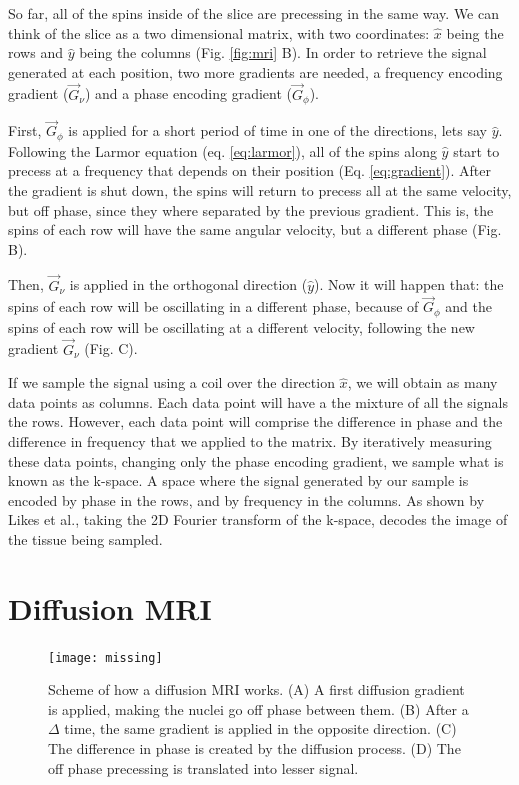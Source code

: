 So far, all of the spins inside of the slice are precessing in the same way.
We can think of the slice as a two dimensional matrix, with two coordinates:
$\hat x$ being the rows and $\hat y$ being the columns (Fig. \ref{fig:mri} B).
In order to retrieve the signal generated at each position, two more gradients
are needed, a frequency encoding gradient ($\vec G_{\nu}$) and a phase encoding
gradient ($\vec G_{\phi}$). 

First, $\vec G_{\phi}$ is applied for a short period of time in one of
the directions, lets say $\hat y$. Following the Larmor equation (eq. \ref{eq:larmor}),
all of the spins along $\hat y$ start to precess at a frequency that depends
on their position (Eq. \ref{eq:gradient}). After the gradient is shut down, the
spins will return to precess all at the same velocity, but off phase, since they 
where separated by the previous gradient. This is, the spins of each row will
have the same angular velocity, but a different phase (Fig. \label{fig:mri} B).

Then, $\vec G_{\nu}$ is applied in the orthogonal direction ($\hat y$).
Now it will happen that: the spins of each row will be oscillating in a
different phase, because of $\vec G_{\phi}$ and the spins of each row will be
oscillating at a different velocity, following the new gradient $\vec G_{\nu}$
(Fig. \label{fig:mri} C).

If we sample the signal using a coil over the direction $\hat x$, we will obtain
as many data points as columns. Each data point will have a the mixture of all
the signals the rows.
However, each data point will comprise the difference in phase and the
difference in frequency that we applied to the matrix. By iteratively
measuring these data points, changing only the phase encoding gradient, we
sample what is known as the k-space\cite{Likes1981}. A space where the signal
generated by our sample is encoded by phase in the rows, and by frequency in the
columns. As shown by Likes et al.\cite{Likes1981}, taking the 2D Fourier
transform of the k-space, decodes the image of the tissue being sampled.

\section{Diffusion MRI}

\begin{figure}[t]
    \texttt{[image: missing]}
    \caption{Scheme of how a diffusion MRI works. (A) A first diffusion gradient
             is applied, making the nuclei go off phase between them. (B) 
             After a $\Delta$ time, the same gradient is applied in the opposite
             direction. (C) The difference in phase is created by the diffusion
             process. (D) The off phase precessing is translated into lesser
             signal.}
     \label{fig:diffusion_gradient}
\end{figure}

